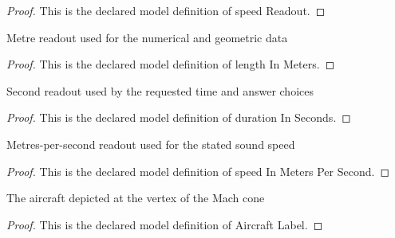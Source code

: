 \begin{proof}
  This is the declared model definition of speed Readout.
\end{proof}
\begin{definition}
  \label{def:physics:phyx-mini-0198:phyxminiproblems-problemphyxmini0198-lengthinmeters}
  Metre readout used for the numerical and geometric data
\end{definition}
\begin{proof}
  This is the declared model definition of length In Meters.
\end{proof}
\begin{definition}
  \label{def:physics:phyx-mini-0198:phyxminiproblems-problemphyxmini0198-durationinseconds}
  Second readout used by the requested time and answer choices
\end{definition}
\begin{proof}
  This is the declared model definition of duration In Seconds.
\end{proof}
\begin{definition}
  \label{def:physics:phyx-mini-0198:phyxminiproblems-problemphyxmini0198-speedinmeterspersecond}
  Metres-per-second readout used for the stated sound speed
\end{definition}
\begin{proof}
  This is the declared model definition of speed In Meters Per Second.
\end{proof}
\begin{definition}
  \label{def:physics:phyx-mini-0198:phyxminiproblems-problemphyxmini0198-aircraftlabel}
  The aircraft depicted at the vertex of the Mach cone
\end{definition}
\begin{proof}
  This is the declared model definition of Aircraft Label.
\end{proof}
